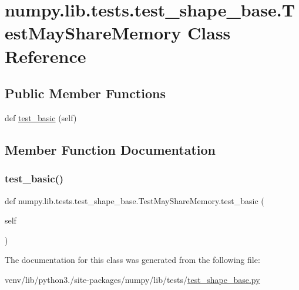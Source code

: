\hypertarget{classnumpy_1_1lib_1_1tests_1_1test__shape__base_1_1TestMayShareMemory}{}\section{numpy.\+lib.\+tests.\+test\+\_\+shape\+\_\+base.\+Test\+May\+Share\+Memory Class Reference}
\label{classnumpy_1_1lib_1_1tests_1_1test__shape__base_1_1TestMayShareMemory}
\subsection*{Public Member Functions}
\begin{DoxyCompactItemize}
\item 
def \hyperlink{classnumpy_1_1lib_1_1tests_1_1test__shape__base_1_1TestMayShareMemory_ac8a6bdbb7c32d5d6042ae8510e2d2b83}{test\+\_\+basic} (self)
\end{DoxyCompactItemize}


\subsection{Member Function Documentation}
\mbox{\label{classnumpy_1_1lib_1_1tests_1_1test__shape__base_1_1TestMayShareMemory_ac8a6bdbb7c32d5d6042ae8510e2d2b83}} 
\subsubsection{\texorpdfstring{test\+\_\+basic()}{test\_basic()}}
{\footnotesize\ttfamily def numpy.\+lib.\+tests.\+test\+\_\+shape\+\_\+base.\+Test\+May\+Share\+Memory.\+test\+\_\+basic (\begin{DoxyParamCaption}\item[{}]{self }\end{DoxyParamCaption})}



The documentation for this class was generated from the following file\+:\begin{DoxyCompactItemize}
\item 
venv/lib/python3./site-\/packages/numpy/lib/tests/\hyperlink{lib_2tests_2test__shape__base_8py}{test\+\_\+shape\+\_\+base.\+py}\end{DoxyCompactItemize}
